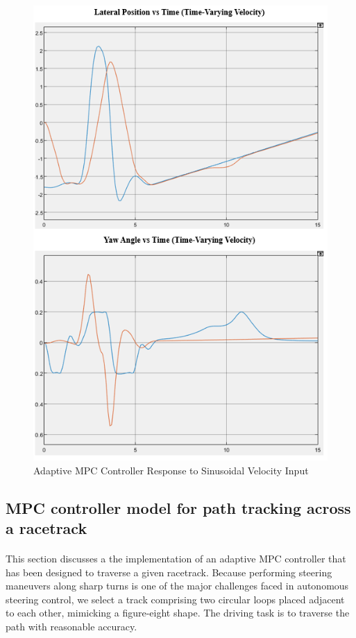 \begin{figure}[H]\label{fig4.5}
\centering \includegraphics[scale=1.1]{Images/adaptive_mpc_varying_response.png}
\caption{Adaptive MPC Controller Response to Sinusoidal Velocity Input}
\end{figure}

\subsection{MPC controller model for path tracking across a racetrack}
\paragraph{}
This section discusses a the implementation of an adaptive MPC controller that has been designed to traverse a given racetrack. Because performing steering maneuvers along sharp turns is one of the major challenges faced in autonomous steering control, we select a track comprising two circular loops placed adjacent to each other, mimicking a figure-eight shape. The driving task is to traverse the path with reasonable accuracy.
\newpage

